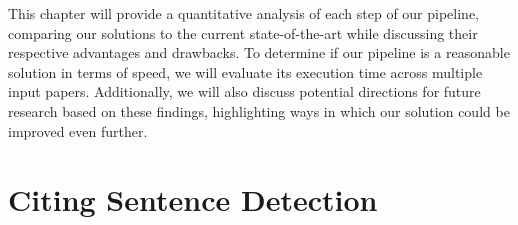 \documentclass[12pt,a4paper]{report}
\begin{document}


% 

This chapter will provide a quantitative analysis of each step of our pipeline, comparing our solutions to the current state-of-the-art while discussing their respective advantages and drawbacks. To determine if our pipeline is a reasonable solution in terms of speed, we will evaluate its execution time across multiple input papers. Additionally, we will also discuss potential directions for future research based on these findings, highlighting ways in which our solution could be improved even further.

\section{Citing Sentence Detection} \label{evaluation-citsent}
\end{document}
